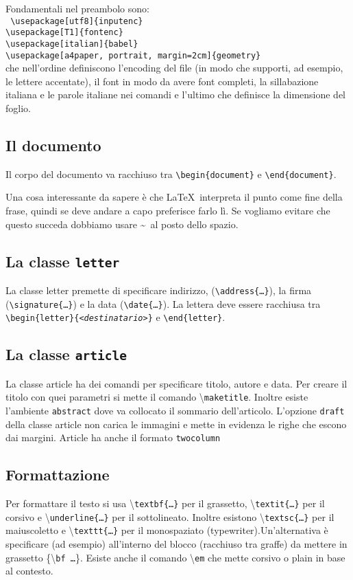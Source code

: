 \documentclass{article}     %
\begin{document}
Fondamentali nel preambolo sono:
\\ \texttt{ \textbackslash usepackage[utf8]\{inputenc\}\\
\textbackslash usepackage[T1]\{fontenc\}\\
\textbackslash usepackage[italian]\{babel\}\\
\textbackslash usepackage[a4paper, portrait, margin=2cm]\{geometry\}}\\
che nell'ordine definiscono l'encoding del file (in modo che supporti, ad esempio, le lettere accentate), il font in modo da avere font completi, la sillabazione italiana e le parole italiane nei comandi e l'ultimo che definisce la dimensione del foglio.
\subsection{Il documento}
Il corpo del documento va racchiuso tra \texttt{\textbackslash begin\{document\}} e \texttt{\textbackslash end\{document\}}. 

Una cosa interessante da sapere è che \LaTeX\ interpreta il punto come fine della frase, quindi se deve andare a capo preferisce farlo lì. Se vogliamo evitare che questo succeda dobbiamo usare \textasciitilde \ al posto dello spazio.
\subsection{La classe \texttt{letter}}
La classe letter premette di specificare indirizzo, (\texttt{\textbackslash address\{\dots\}}), la firma (\texttt{\textbackslash signature\{\dots\}}) e la data (\texttt{\textbackslash date\{\dots\}}). La lettera deve essere racchiusa tra \texttt{\textbackslash begin\{letter\}\{\textit{\textless destinatario\textgreater}\}} e \texttt{\textbackslash end\{letter\}}.

\subsection{La classe \texttt{article}}
La classe article ha dei comandi per specificare titolo, autore e data. Per creare il titolo con quei parametri si mette il comando \textbackslash\texttt{maketitle}. Inoltre esiste l'ambiente \texttt{abstract} dove va collocato il sommario dell'articolo. L'opzione \texttt{draft} della classe article non carica le immagini e mette in evidenza le righe che escono dai margini. Article ha anche il formato \texttt{twocolumn}

\subsection{Formattazione}
Per formattare il testo si usa \textbackslash\texttt{textbf\{\dots\}} per il grassetto, \textbackslash\texttt{textit\{\dots\}} per il corsivo e \textbackslash\texttt{underline\{\dots\}} per il sottolineato. Inoltre esistono \textbackslash\texttt{textsc\{\dots\}} per il maiuscoletto e \textbackslash\texttt{texttt\{\dots\}} per il monospaziato (typewriter).Un'alternativa è specificare (ad esempio)  all'interno del blocco (racchiuso tra graffe) da mettere in grassetto \{\textbackslash\texttt{bf~\dots}\}. Esiste anche il comando \textbackslash\texttt{em} che mette corsivo o plain in base al contesto. 
\end{document}
